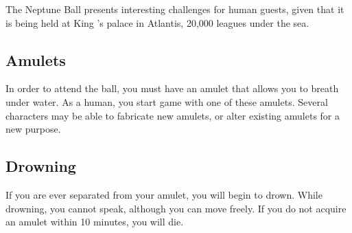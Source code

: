 \documentclass[blue]{NeptuneBall}
\begin{document}
\name{\bHuman{}}

The Neptune Ball presents interesting challenges for human guests, given that it is being held at King \cKing{\MYname{}}'s palace in Atlantis, 20,000 leagues under the sea.  

\subsection*{Amulets}
In order to attend the ball, you must have an amulet that allows you to breath under water. As a human, you start game with one of these amulets. Several characters may be able to fabricate new amulets, or alter existing amulets for a new purpose.

\subsection*{Drowning}
If you are ever separated from your amulet, you will begin to drown. While drowning, you cannot speak, although you can move freely. If you do not acquire an amulet within 10 minutes, you will die.
\end{document}
